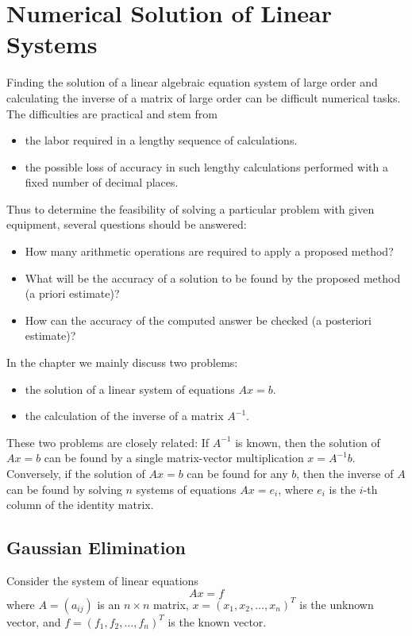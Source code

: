 \documentclass[../main.tex]{subfiles}
\begin{document}
\chapter{Numerical Solution of Linear Systems}

Finding the solution of a linear algebraic equation system of large order and calculating the inverse of a matrix of large order can be difficult numerical tasks. The difficulties are practical and stem from
\begin{itemize}
	\item the labor required in a lengthy sequence of calculations.
	\item the possible loss of accuracy in such lengthy calculations performed with a fixed number of decimal places.
\end{itemize}
Thus to determine the feasibility of solving a particular problem with given equipment, several questions should be answered:
\begin{itemize}
	\item How many arithmetic operations are required to apply a proposed method?
	\item What will be the accuracy of a solution to be found by the proposed method (a priori estimate)?
	\item How can the accuracy of the computed answer be checked (a posteriori estimate)?
\end{itemize}

In the chapter we mainly discuss two problems:
\begin{itemize}
	\item the solution of a linear system of equations $Ax=b$.
	\item the calculation of the inverse of a matrix $A^{-1}$.
\end{itemize}

These two problems are closely related: If $A^{-1}$ is known, then the solution of $Ax=b$ can be found by a single matrix-vector multiplication $x=A^{-1}b$. Conversely, if the solution of $Ax=b$ can be found for any $b$, then the inverse of $A$ can be found by solving $n$ systems of equations $Ax=e_i$, where $e_i$ is the $i$-th column of the identity matrix.

\section{Gaussian Elimination}
Consider the system of linear equations
\begin{equation}
	A x = f
\end{equation}
where $A = (a_{ij})$ is an $n \times n$ matrix, $x = (x_1, x_2, \ldots, x_n)^T$ is the unknown vector, and $f = (f_1, f_2, \ldots, f_n)^T$ is the known vector.
\end{document}
